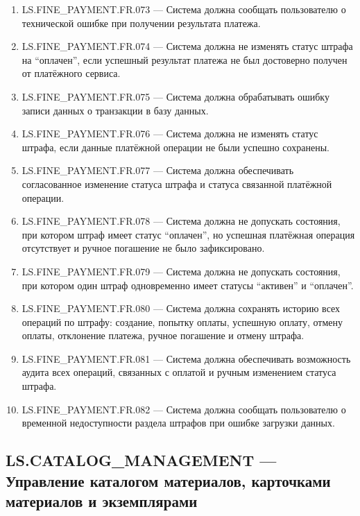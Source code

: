 \documentclass[12pt,a4paper]{article}
\begin{document}
\begin{enumerate}
		\item LS.FINE\_PAYMENT.FR.073 --- Система должна сообщать пользователю о технической ошибке
		при получении результата платежа.
		
		\item LS.FINE\_PAYMENT.FR.074 --- Система должна не изменять статус штрафа на ``оплачен'',
		если успешный результат платежа не был достоверно получен от платёжного сервиса.
		
		\item LS.FINE\_PAYMENT.FR.075 --- Система должна обрабатывать ошибку записи данных о
		транзакции в базу данных.
		
		\item LS.FINE\_PAYMENT.FR.076 --- Система должна не изменять статус штрафа, если данные
		платёжной операции не были успешно сохранены.
		
		\item LS.FINE\_PAYMENT.FR.077 --- Система должна обеспечивать согласованное изменение статуса
		штрафа и статуса связанной платёжной операции.
		
		\item LS.FINE\_PAYMENT.FR.078 --- Система должна не допускать состояния, при котором штраф
		имеет статус ``оплачен'', но успешная платёжная операция отсутствует и ручное
		погашение не было зафиксировано.
		
		\item LS.FINE\_PAYMENT.FR.079 --- Система должна не допускать состояния, при котором один
		штраф одновременно имеет статусы ``активен'' и ``оплачен''.
		
		\item LS.FINE\_PAYMENT.FR.080 --- Система должна сохранять историю всех операций по штрафу:
		создание, попытку оплаты, успешную оплату, отмену оплаты, отклонение платежа,
		ручное погашение и отмену штрафа.
		
		\item LS.FINE\_PAYMENT.FR.081 --- Система должна обеспечивать возможность аудита всех операций,
		связанных с оплатой и ручным изменением статуса штрафа.
		
		\item LS.FINE\_PAYMENT.FR.082 --- Система должна сообщать пользователю о временной
		недоступности раздела штрафов при ошибке загрузки данных.
	\end{enumerate}
	
	\subsection{LS.CATALOG\_MANAGEMENT --- Управление каталогом материалов, карточками материалов и экземплярами}
	
\end{document}
